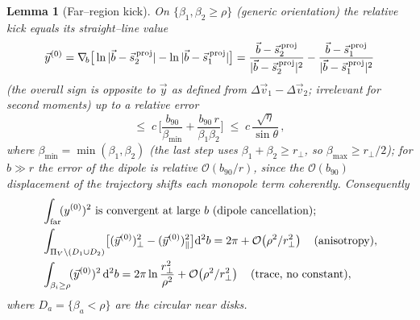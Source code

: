 \documentclass[11pt]{article}
\newcommand{\dd}{\mathrm{d}}
\newcommand{\rp}{r_\perp}
\newcommand{\bv}{\vec b}
\newcommand{\bnt}{b_{90}}
\newcommand{\order}[1]{\mathcal O\!\left(#1\right)}
\newtheorem{lemma}{Lemma}
\begin{document}
\begin{lemma}[Far--region kick]
\label{lem:far}
On $\{\beta_1,\beta_2\ge\rho\}$ (generic orientation) the relative kick equals its straight--line
value
\begin{equation}
  \vec y^{(0)}=\nabla_{\!b}\big[\ln|\bv-\vec s_2^{\,\rm proj}|-\ln|\bv-\vec s_1^{\,\rm proj}|\big]
            =\frac{\bv-\vec s_2^{\,\rm proj}}{|\bv-\vec s_2^{\,\rm proj}|^2}
             -\frac{\bv-\vec s_1^{\,\rm proj}}{|\bv-\vec s_1^{\,\rm proj}|^2}
  \label{eq:y0}
\end{equation}
(the overall sign is opposite to $\vec y$ as defined from $\Delta\vec v_1-\Delta\vec v_2$;
irrelevant for second moments) up to a relative error
\begin{equation}
  \le\;c\,\Big[\frac{\bnt}{\beta_{\min}}+\frac{\bnt\,r}{\beta_1\beta_2}\Big]
  \;\le\;c\,\frac{\sqrt\eta}{\sin\theta}\,,
  \label{eq:far-error}
\end{equation}
where $\beta_{\min}=\min(\beta_1,\beta_2)$ (the last step uses $\beta_1+\beta_2\ge\rp$, so
$\beta_{\max}\ge\rp/2$); for $b\gg r$ the error of the \emph{dipole} is relative
$\order{\bnt/r}$, since the $\order\bnt$ displacement of the trajectory shifts each monopole term
coherently. Consequently
\begin{align}
  &\int_{\rm far}\!(y^{(0)})^2\ \text{is convergent at large }b\ \text{(dipole cancellation)}; \label{eq:far-conv}\\
  &\int_{\Pi_V\setminus(D_1\cup D_2)}\!\big[(\vec y^{(0)})_\perp^2-(\vec y^{(0)})_\parallel^2\big]\dd^2b
  =2\pi+\order{\rho^2/\rp^2}
   \quad(\text{anisotropy}),\label{eq:far-aniso}\\
  &\int_{\beta_i\ge\rho}\!(\vec y^{(0)})^2\,\dd^2b=2\pi\ln\frac{\rp^2}{\rho^2}+\order{\rho^2/\rp^2}
   \quad(\text{trace, no constant}),
  \label{eq:far-trace}
\end{align}
where $D_a=\{\beta_a<\rho\}$ are the circular near disks.
\end{lemma}
\end{document}
